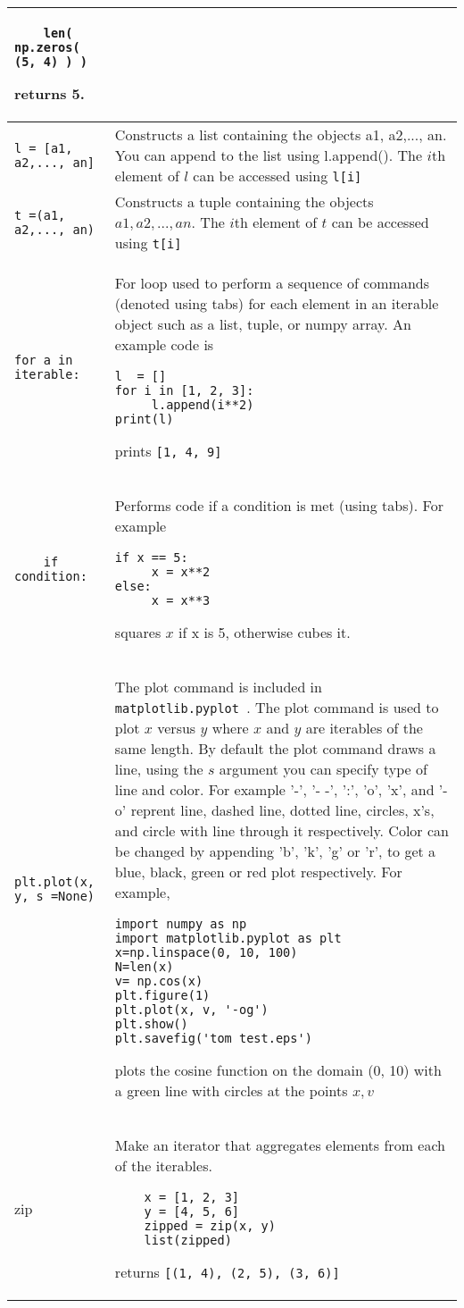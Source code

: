 \documentclass[]{article}
\begin{document}
\begin{longtable}{ |m{6cm}  | m{11cm} |}
	\begin{verbatim}
	len( np.zeros( (5, 4) ) )
	\end{verbatim}
    returns 5.
	\\\hline
	\texttt{l = [a1, a2,..., an]} & Constructs a list containing the objects a1, a2,..., an.  You can append to the list using l.append().  The $i$th element of $l$ can be accessed using {\texttt{l[i]} } 
	\\\hline
	\texttt{t =(a1, a2,..., an)} & Constructs a tuple containing the objects $a1, a2,..., an$.  The $i$th element of $t$ can be accessed using {\texttt{t[i]} }
	\\\hline
    \begin{verbatim}for a in iterable: \end{verbatim}  & For loop used to perform a sequence of commands (denoted using tabs) for each element in an iterable object such as a list, tuple, or numpy array. An example code is 
	\begin{verbatim}
l  = []
for i in [1, 2, 3]:
     l.append(i**2)
print(l)
	\end{verbatim} 
    prints \texttt{[1, 4, 9]} 
	\\\hline
	\begin{verbatim}
	if condition:
	\end{verbatim}
    & Performs code if a condition is met (using tabs). For example
	\begin{verbatim}
if x == 5:
     x = x**2
else:
     x = x**3
	\end{verbatim}
    squares $x$ if x is 5, otherwise cubes it.
	\\\hline
	\texttt{plt.plot(x, y, s =None)} & The plot command is included in {\texttt{matplotlib.pyplot }}.  The plot command is used to plot $x$ versus $y$ where $x$ and $y$ are iterables of the same length.  By default the plot command draws a line, using the $s$ argument you can specify type of line and color.  For example '-', '- -', ':', 'o', 'x', and '-o' reprent line, dashed line, dotted line, circles, x's, and circle with line through it respectively.  Color can be changed by appending 'b', 'k', 'g' or 'r', to get a blue, black, green or red plot respectively.  For example, 
	\begin{verbatim}
import numpy as np
import matplotlib.pyplot as plt
x=np.linspace(0, 10, 100)
N=len(x)
v= np.cos(x)
plt.figure(1)
plt.plot(x, v, '-og')
plt.show()
plt.savefig('tom_test.eps')
	\end{verbatim} 
    plots the cosine function on the domain (0, 10) with a green line with circles at the points $x, v$
	\\\hline
    zip & Make an iterator that aggregates elements from each of the iterables.
    \begin{verbatim}
    x = [1, 2, 3]
    y = [4, 5, 6]
    zipped = zip(x, y)
    list(zipped)
    \end{verbatim}
    returns \texttt{[(1, 4), (2, 5), (3, 6)]}
    \\\hline
\end{longtable}
\end{document}
